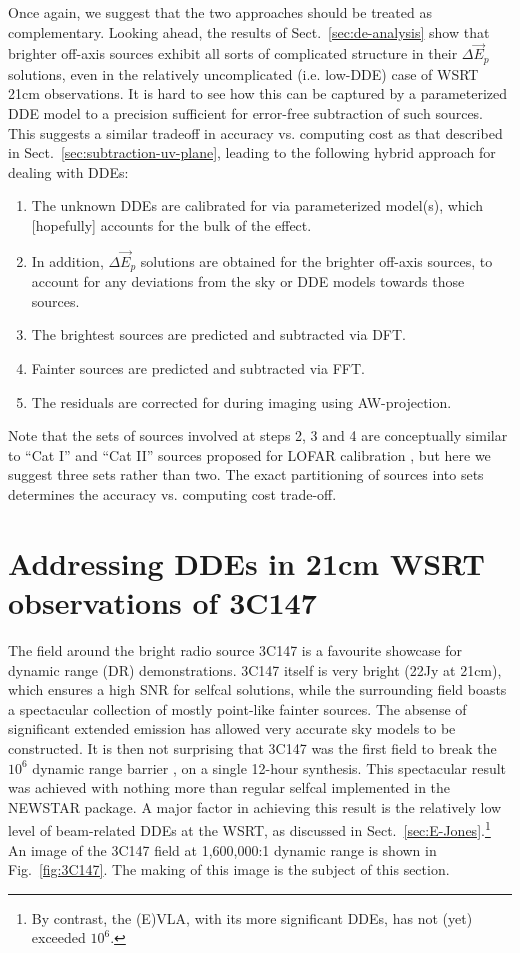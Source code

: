 \documentclass[]{aa}
\newcommand{\jones}[2]{\vec {#1}_{#2}}
\begin{document}
Once again, we suggest that the two approaches should be treated as complementary. Looking ahead, the results of Sect.~\ref{sec:de-analysis} show that brighter off-axis sources exhibit all sorts of complicated structure in their $\Delta\jones{E}{p}$ solutions, even in the relatively uncomplicated (i.e. low-DDE) case of WSRT 21cm observations. It is hard to see how this can be captured by a parameterized DDE model to a precision sufficient for error-free subtraction of such sources. This suggests a similar tradeoff in accuracy vs. computing cost as that described in Sect.~\ref{sec:subtraction-uv-plane}, leading to the following hybrid approach for dealing with DDEs:

\begin{enumerate}
\item The unknown DDEs are calibrated for via parameterized model(s), which [hopefully] accounts for the bulk of the effect.
\item In addition, $\Delta\jones{E}{p}$ solutions are obtained for the brighter off-axis sources, to account for any deviations from the sky or DDE models towards those sources.
\item The brightest sources are predicted and subtracted via DFT. 
\item Fainter sources are predicted and subtracted via FFT.
\item The residuals are corrected for during imaging using AW-projection.
\end{enumerate}

Note that the sets of sources involved at steps 2, 3 and 4 are conceptually similar to ``Cat I'' and ``Cat II'' sources proposed for LOFAR calibration \citep{JEN:LOFAR3}, but here we suggest three sets rather than two. The exact partitioning of sources into sets determines the accuracy vs. computing cost trade-off.

\section{Addressing DDEs in 21cm WSRT observations of \label{sec:3C147}3C147}

The field around the bright radio source 3C147 is a favourite showcase for dynamic range (DR) demonstrations. 3C147 itself is very bright (22Jy at 21cm), which ensures a high SNR for selfcal solutions, while the surrounding field boasts a spectacular collection of mostly point-like fainter sources. The absense of significant extended emission has allowed very accurate sky models to be constructed. It is then not surprising that 3C147 was the first field to break the $10^6$ dynamic range barrier \citep{deBruyn:million,deBruyn:3C147}, on a single 12-hour synthesis. This spectacular result was achieved with nothing more than regular selfcal implemented in the NEWSTAR package. A major factor in achieving this result is the relatively low level of beam-related DDEs at the WSRT, as discussed in 
Sect.~\ref{sec:E-Jones}.\footnote{By contrast, the (E)VLA, with its more significant DDEs, has not (yet) exceeded $10^6$.} An image of the 3C147 field at 1,600,000:1 dynamic range is shown in Fig.~\ref{fig:3C147}. The making of this image is the subject of this section. 
\end{document}
